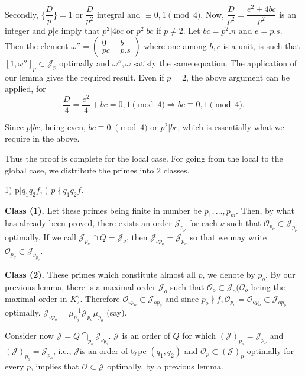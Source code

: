  Secondly, $\Bigg\{\dfrac{D}{p}\Bigg\} = 1$ or $\dfrac{D}{p^2}$
 integral and $\equiv 0, 1 \pmod 4$. Now, $\dfrac{D}{p^2} =
 \dfrac{e^2 + 4 bc}{p^2}$ is an integer and $p | e$ imply that $p^2 |
 4bc$ or $p^2 | bc$ if $p \neq 2$. Let $bc = p^2. n$ and $e =
 p.s$. Then the element $\omega'' = \begin{pmatrix}
   0~&~b\\pc~&~p.s \end{pmatrix}$ where one among $b, c$ is a unit, is
 such that $[1, \omega'']_p \subset \mathcal{J}_p$ optimally and
 $\omega'', \omega$ satisfy the same equation. The application of our
 lemma gives the required result. Even if $p = 2$, the above argument
 can be applied, for 
 $$
 \frac{D}{4} = \frac{e^2}{4} + bc = 0, 1 \pmod 4 \Longrightarrow bc
 \equiv 0, 1 \pmod 4. 
 $$
 
 Since $p | bc$, being even, $bc \equiv 0. \pmod 4$ or $p^2 | bc$,
 which is essentially what we require in the above. 
 
 Thus the proof is complete for the local case. For going from the
 local to the global case, we distribute the primes into $2$ classes. 
 
 1) \quad p$ | q_1 q_2 f$, ) \quad $p \nmid q_1 q_2 f$.
 
 
\medskip
\noindent
\textbf{Class (1).} Let these primes being finite in number be $p_1,
\ldots, p_m$. Then, by what has already been proved, there exists an
order $\mathcal{J}_{p_\nu}$ for each $\nu$ such that $\mathscr{O}_{p_
  \nu} \subset \mathcal{J}_{p_\nu}$ optimally. If we call
$\mathcal{J}_{p_\nu} \cap Q = \mathcal{J}_{\nu}$, then
$\mathcal{J}_{\nu p_\nu} =  \mathcal{J}_{p_\nu}$ so that we may write
$\mathscr{O}_{p_\nu} \subset \mathcal{J}_{\nu_{p_\nu}}$. 

\medskip
\noindent
\textbf{Class (2).} These primes which constitute almost all $p$, we
denote by $p_o$. By our previous lemma, there is a maximal order
$\mathcal{J}_o$ such that $\mathscr{O}_o \subset \mathcal{J}_o (
\mathscr{O}_o$ being the maximal order in $K)$. Therefore
$\mathscr{O}_{op_o} \subset \mathcal{J}_{op_o}$ and since $p_o \nmid
f, \mathscr{O}_{p_o} = \mathscr{O}_{op_o} \subset \mathcal{J}_{op_o}$
optimally. $\mathcal{J}_{op_o} = \mu^{-1}_{p_o} \mathcal{J}_{p_o}
\mu_{p_o}$ (say). 

Consider now $\mathcal{J} = Q \bigcap\limits_{p_\nu }
\mathcal{J}_{\nu_{\mathfrak{p}_o}}$. $\mathcal{J}$ is an order of $Q$ for which
$(\mathcal{J})_{p_\nu} = \mathcal{J}_{p_\nu}$ and $(\mathcal{J})_{p_o}
= \mathcal{J}_{p_o}$, i.e., $\mathcal{J}$is an order of type $(q_1, q_2)$ and
$\mathscr{O}_p \subset (\mathcal{J})_p$ optimally for every $p$,
implies that $\mathscr{O} \subset \mathcal{J}$  optimally, by a
previous lemma.  

